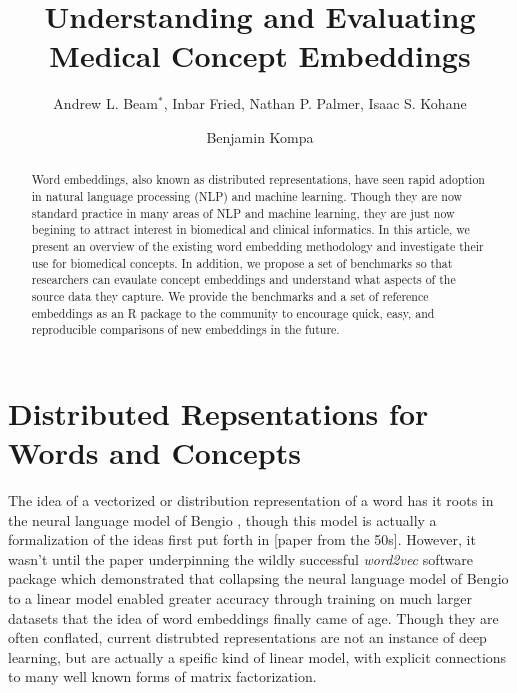 \documentclass{ws-procs11x85}
\begin{document}
\title{Understanding and Evaluating Medical Concept Embeddings}

\author{Andrew L. Beam$^*$, Inbar Fried, Nathan P. Palmer, Isaac S. Kohane}

\address{Department of Biomedical Informatics, Harvard Medical School,\\
Boston, MA, 02115, USA\\
$^*$E-mail: Andrew\_Beam@hms.harvard.edu\\
www.university\_name.edu}

\author{Benjamin Kompa}

\address{University of North Carolina, Chapel Hill,\\
Chapel Hill, NC, 27514, USA\\
E-mail: kompa@live.unc.edu}

\begin{abstract}
Word embeddings, also known as distributed representations, have seen rapid adoption in natural language processing (NLP) and machine learning. Though they are now standard practice in many areas of NLP and machine learning, they are just now begining to attract interest in biomedical and clinical informatics. In this article, we present an overview of the existing word embedding methodology and investigate their use for biomedical concepts. In addition, we propose a set of benchmarks so that researchers can evaulate concept embeddings and understand what aspects of the source data they capture. We provide the benchmarks and a set of reference embeddings as an R package to the community to encourage quick, easy, and reproducible comparisons of new embeddings in the future.
\end{abstract}


\bodymatter


\section{Distributed Repsentations for Words and Concepts}\label{aba:intro}
The idea of a vectorized or distribution representation of a word has it roots in the neural language model of Bengio \cite{bengio2003neural}, though this model is actually a formalization of the ideas first put forth in [paper from the 50s]. However, it wasn't until the paper\cite{mikolov2013distributed} underpinning the wildly successful \emph{word2vec} software package which demonstrated that collapsing the neural language model of Bengio\cite{bengio2003neural} to a linear model enabled greater accuracy through training on much larger datasets that the idea of word embeddings finally came of age. Though they are often conflated, current distrubted representations are not an instance of deep learning, but are actually a speific kind of linear model, with explicit connections to many well known forms of matrix factorization.\cite{levy2014neural}
\end{document}
